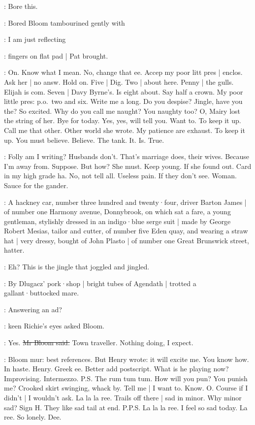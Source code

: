 \BloomIntA:
Bore this.

:
Bored Bloom tambourined gently with

\BloomIntA:
I am just reflecting

:
fingers on flat pad |
Pat brought.

\BloomIntA:
On.
Know what I mean.
No,
change that ee.
Accep my poor litt pres |
enclos.
Ask her |
no answ.
Hold on.
Five |
Dig.
Two |
about here.
Penny |
the gulls.
Elijah is com.
Seven |
Davy Byrne's.
Is eight about.
Say half a crown.
My poor little pres:
p.o.\
two and six.
Write me a long.
Do you despise?
Jingle,
have you the?
So excited.
Why do you call me naught?
You naughty too?
O,
Mairy lost the string of her.
Bye for today.
Yes,
yes,
will tell you.
Want to.
To keep it up.
Call me that other.
Other world she wrote.
My patience are exhaust.
To keep it up.
You must believe.
Believe.
The tank.
It.
Is.
True.

\BloomIntB:
Folly am I writing?
Husbands don't.
That's marriage does,
their wives.
Because I'm away from.
Suppose.
But how?
She must.
Keep young.
If she found out.
Card in my high grade ha.
No,
not tell all.
Useless pain.
If they don't see.
Woman.
Sauce for the gander.

:
A hackney car,
number three hundred and twenty·four,
driver Barton James |
of number one Harmony avenue,
Donnybrook,
on which sat a fare,
a young gentleman,
stylishly dressed in an indigo·blue serge suit |
made by George Robert Mesias,
tailor and cutter,
of number five Eden quay,
and wearing a straw hat |
very dressy,
bought of John Plasto |
of number one Great Brunswick street,
hatter.

\BloomIntA:
Eh?
This is the jingle that joggled and jingled.

:
By Dlugacz' pork·shop |
bright tubes of Agendath |
trotted a gallant·buttocked mare.

\goulding:
Answering an ad?

:
keen Richie's eyes asked Bloom.

\Bloom:
Yes.
\sout{Mr Bloom said.}
Town traveller.
Nothing doing,
I expect.

\BloomIntA:
Bloom mur:
best references.
But Henry wrote:
it will excite me.
You know how.
In haste.
Henry.
Greek ee.
Better add postscript.
What is he playing now?
Improvising.
Intermezzo.
P.S\@.
The rum tum tum.
How will you pun?
You punish me?
Crooked skirt swinging,
whack by.
Tell me |
I want to.
Know.
O\@.
Course if I didn't |
I wouldn't ask.
La la la ree.
Trails off there |
sad in minor.
Why minor sad?
Sign H\@.
They like sad tail at end.
P.P.S\@.
La la la ree.
I feel so sad today.
La ree.
So lonely.
Dee.

